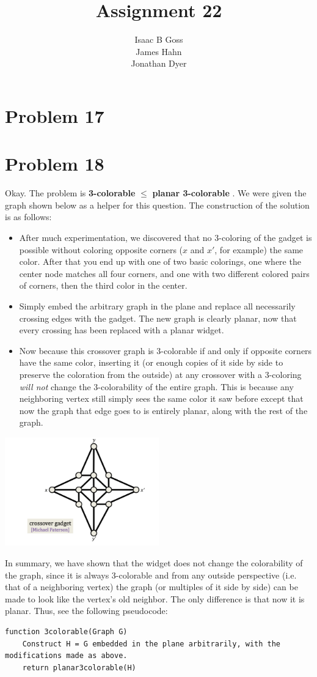 \documentclass{article}
\author{Isaac B Goss\\ James Hahn\\ Jonathan Dyer}
\title{Assignment 22}
\providecommand{\prob}[1]{\section*{Problem #1}}
\providecommand{\reducible}[2]{
  \textbf{#1} $\leq$ \textbf{#2}
}
\begin{document}
\maketitle
\prob{17}



\prob{18}
Okay. The problem is \reducible{3-colorable}{planar 3-colorable}. We were given the graph shown below as a helper for this question. The construction of the solution is as follows:\\
\begin{itemize}
    \item After much experimentation, we discovered that no 3-coloring of the gadget is possible without coloring opposite corners ($x$ and $x'$, for example) the same color. After that you end up with one of two basic colorings, one where the center node matches all four corners, and one with two different colored pairs of corners, then the third color in the center.
    \item Simply embed the arbitrary graph in the plane and replace all necessarily crossing edges with the gadget. The new graph is clearly planar, now that every crossing has been replaced with a planar widget.
    \item Now because this crossover graph is 3-colorable if and only if opposite corners have the same color, inserting it  (or enough copies of it side by side to preserve the coloration from the outside) at any crossover with a 3-coloring \textit{will not} change the 3-colorability of the entire graph. This is because any neighboring vertex still simply sees the same color it saw before except that now the graph that edge goes to is entirely planar, along with the rest of the graph.
\end{itemize}

\begin{center}
    \includegraphics[width=0.5\textwidth]
        {gadget}
\end{center}

In summary, we have shown that the widget does not change the colorability of the graph, since it is always 3-colorable and from any outside perspective (i.e. that of a neighboring vertex) the graph (or multiples of it side by side) can be made to look like the vertex's old neighbor. The only difference is that now it is planar. Thus, see the following pseudocode:\\
\begin{lstlisting}
function 3colorable(Graph G)
    Construct H = G embedded in the plane arbitrarily, with the modifications made as above.
    return planar3colorable(H)
\end{lstlisting}
\end{document}
